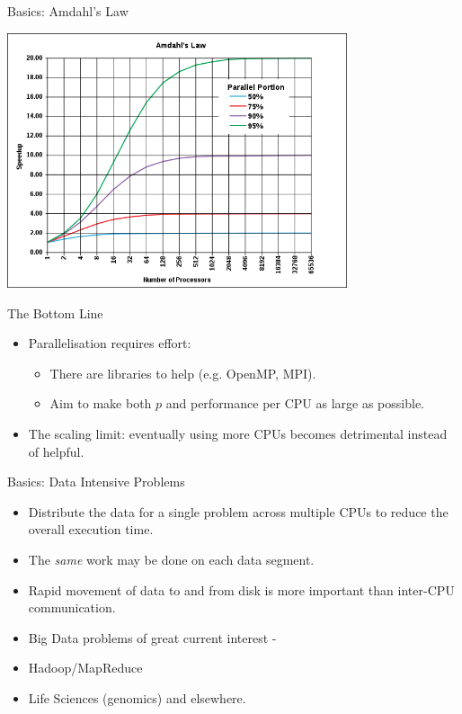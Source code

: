 \begin{frame}{Basics: Amdahl's Law}
\centerline{\includegraphics[width=0.75\textwidth]{imgs/AmdahlsLaw.png}}%
\smallskip
\end{frame}

\begin{frame}{The Bottom Line}
\begin{itemize}
\item{Parallelisation requires effort:}
\begin{itemize}
\item{There are libraries to help (e.g. \alert{OpenMP}, \alert{MPI}).}
\item{Aim to make both $p$ and performance per CPU as large as possible.}
\end{itemize}
\pause
\item{The scaling limit: eventually using more CPUs becomes \alert{detrimental} instead of helpful.}
\end{itemize}
\end{frame}

\begin{frame}{Basics: Data Intensive Problems}
\begin{itemize}
\item{Distribute the \alert{data} for a \alert{single problem} across multiple CPUs to reduce the overall execution time.}
\pause
\item{The \emph{same} work may be done on each data segment.}
\pause
\item{Rapid movement of data to and from disk is more important than inter-CPU communication.}
\pause
\item{\alert{Big Data} problems of great current interest -}
\item{Hadoop/MapReduce}
\item{Life Sciences (genomics) and elsewhere.}
\end{itemize}
\end{frame}

